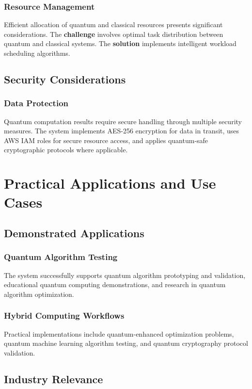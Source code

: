\documentclass[onecolumn]{IEEEtran}
\begin{document}
\subsubsection{Resource Management}
Efficient allocation of quantum and classical resources presents significant considerations. The \textbf{challenge} involves optimal task distribution between quantum and classical systems. The \textbf{solution} implements intelligent workload scheduling algorithms.

\subsection{Security Considerations}

\subsubsection{Data Protection}
Quantum computation results require secure handling through multiple security measures. The system implements AES-256 encryption for data in transit, uses AWS IAM roles for secure resource access, and applies quantum-safe cryptographic protocols where applicable.

\section{Practical Applications and Use Cases}

\subsection{Demonstrated Applications}

\subsubsection{Quantum Algorithm Testing}
The system successfully supports quantum algorithm prototyping and validation, educational quantum computing demonstrations, and research in quantum algorithm optimization.

\subsubsection{Hybrid Computing Workflows}
Practical implementations include quantum-enhanced optimization problems, quantum machine learning algorithm testing, and quantum cryptography protocol validation.

\subsection{Industry Relevance}
\end{document}
